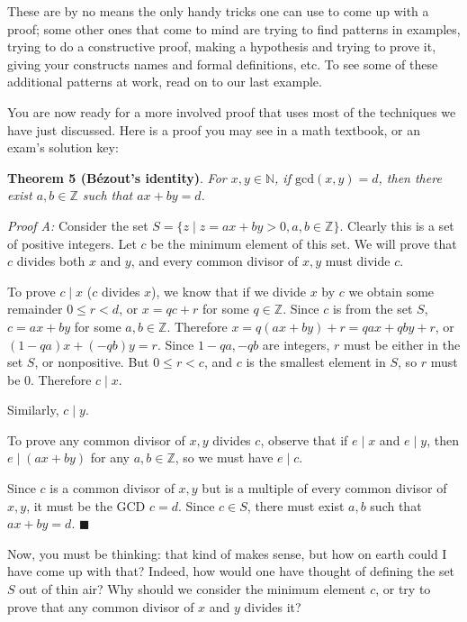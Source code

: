 \documentclass[11pt]{article}
\begin{document}
    These are by no means the only handy tricks one can use to come up with a proof;
    some other ones that come to mind are trying to find patterns in examples, trying
    to do a constructive proof, making a hypothesis and trying to prove it, giving
    your constructs names and formal definitions, etc. To see some of these additional
    patterns at work, read on to our last example.
    

    You are now ready for a more involved proof that uses most of the techniques we
    have just discussed. Here is a proof you may see in a math textbook, or an exam's
    solution key:
    
    \textbf{Theorem 5 (Bézout's identity)}. \textit{For $x,y\in\mathbb{N}$, if
    $\mathrm{gcd}(x,y)=d$, then there exist $a,b\in\mathbb{Z}$ such that $ax+by=d$.}
    
    \textit{Proof A:} Consider the set $S=\{z\mid z=ax+by>0, a,b\in\mathbb{Z}\}$. Clearly 
    this is a set of positive integers. Let $c$ be the minimum element of this set. We
    will prove that $c$ divides both $x$ and $y$, and every common divisor of $x,y$ must
    divide $c$.
    
    To prove $c\mid x$ ($c$ divides $x$), we know that if we divide $x$ by $c$ we obtain
    some remainder $0\leq r<d$, or $x=qc+r$ for some $q\in\mathbb{Z}$. Since $c$ is from
    the set $S$, $c=ax+by$ for some $a,b\in\mathbb Z$. Therefore $x=q(ax+by)+r=qax+qby+r$,
    or $(1-qa)x+(-qb)y=r$. Since $1-qa,-qb$ are integers, $r$ must be either in the set
    $S$, or nonpositive. But $0\leq r<c$, and $c$ is the smallest element in $S$, so $r$
    must be 0. Therefore $c\mid x$.
    
    Similarly, $c\mid y$.
    
    To prove any common divisor of $x,y$ divides $c$, observe that if $e\mid x$ and
    $e\mid y$, then $e\mid(ax+by)$ for any $a,b\in\mathbb Z$, so we must have $e\mid c$.
    
    Since $c$ is a common divisor of $x,y$ but is a multiple of every common divisor
    of $x,y$, it must be the GCD $c=d$. Since $c\in S$, there must exist $a,b$ such that
    $ax+by=d$. $\blacksquare$
    
    Now, you must be thinking: that kind of makes sense, but how on earth could I have
    come up with that? Indeed, how would one have thought of defining the set $S$ out
    of thin air? Why should we consider the minimum element $c$, or try to prove that
    any common divisor of $x$ and $y$ divides it?
    
\end{document}
